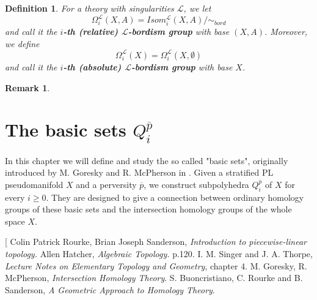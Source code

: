 \documentclass[11pt]{book}
\newtheorem{definition}{Definition}
\newtheorem{remark}{Remark}
\begin{document}
\begin{definition}
For a theory with singularities $\mathcal{L}$, we let  
\begin{equation*}
\Omega_i^\mathcal{L}(X,A)= Isom_i^\mathcal{L}(X,A)/ \sim_{bord}
\end{equation*}
 and call it the \textbf{$i$-th (relative) $\mathcal{L}$-bordism group} with base $(X,A)$. Moreover, we define
\begin{equation*}
\Omega_i^\mathcal{L}(X)=\Omega_i^\mathcal{L}(X, \emptyset)
\end{equation*}
and call it the \textbf{$i$-th (absolute) $\mathcal{L}$-bordism group} with base $X$.
\end{definition}

\begin{remark}

\end{remark}


\chapter{The basic sets $Q_i^{\overline{p}}$}
In this chapter we will define and study the so called "basic sets", originally introduced by M. Goresky and R. McPherson in \cite{GM}. Given a stratified PL pseudomanifold $X$ and a perversity $\overline{p}$, we construct subpolyhedra $Q_i^{\overline{p}}$ of $X$ for every $i \geq 0$. They are designed to give a connection between ordinary homology groups of these basic sets and the intersection homology groups of the whole space $X$.



\begin{thebibliography}[
Colin Patrick Rourke, Brian Joseph Sanderson, \textit{Introduction to piecewise-linear topology.}
Allen Hatcher, \textit{Algebraic Topology.} p.120.
I. M. Singer and J. A. Thorpe, \textit{Lecture Notes on Elementary Topology and Geometry}, chapter 4.
M. Goresky, R. McPherson, \textit{Intersection Homology Theory}.
S. Buoncristiano, C. Rourke and B. Sanderson, \textit{A Geometric Approach to Homology Theory}.
\end{thebibliography}
\end{document}
